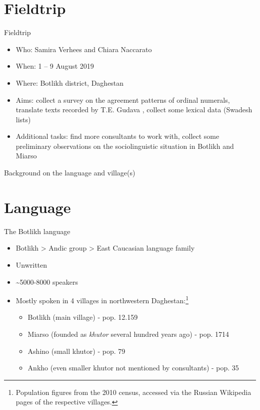 
 



\begin{frame}
\titlepage

\end{frame}

\section{Fieldtrip}
\begin{frame}{Fieldtrip}
\begin{itemize}
    \item Who: Samira Verhees and Chiara Naccarato
    \item When: 1 -- 9 August 2019
    \item Where: Botlikh district, Daghestan
    \item Aims: collect a survey on the agreement patterns of ordinal numerals, translate texts recorded by T.E. Gudava \citep{gudava1962}, collect some lexical data (Swadesh lists)
    \pause
    \item Additional tasks: find more consultants to work with, collect some preliminary observations on the sociolinguistic situation in Botlikh and Miarso
\end{itemize}
\end{frame}

\begin{frame}
\begin{center}
    \begin{huge} \color{darkscarlet}
    Background on the language and village(s)
    \end{huge}
\end{center}
\end{frame}

\section{Language}
\begin{frame}{The Botlikh language}
\begin{itemize}
    \item Botlikh > Andic group > East Caucasian language family
    \item Unwritten
    \item \textasciitilde{}5000-8000 speakers
    \item Mostly spoken in 4 villages in northwestern Daghestan:\footnote{\footnotesize{Population figures from the 2010 census, accessed via the Russian Wikipedia pages of the respective villages.}}
    \begin{itemize}
        \item Botlikh (main village) - pop. 12.159
        \item Miarso (founded as \textit{khutor} several hundred years ago) - pop. 1714
        \item Ashino (small khutor) - pop. 79
        \item Ankho (even smaller khutor not mentioned by consultants) - pop. 35
    \end{itemize}
\end{itemize}
\end{frame}

